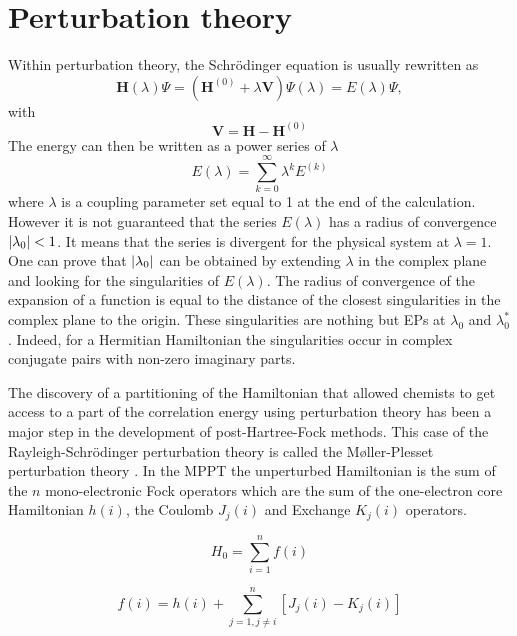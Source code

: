 \documentclass[11pt,a4paper]{article}
\newcommand{\bH}{\mathbf{H}}
\newcommand{\bV}{\mathbf{V}}
\begin{document}
\section{Perturbation theory}


Within perturbation theory, the Schr\"odinger equation is usually rewritten as 
\begin{equation}
	\bH(\lambda) \Psi = (\bH^{(0)} + \lambda \bV ) \Psi(\lambda) = E(\lambda) \Psi,
\end{equation}
with
\begin{equation}
\bV=\bH - \bH^{(0)}
\end{equation}
The energy can then be written as a power series of $\lambda$
\begin{equation}
	E(\lambda) = \sum_{k=0}^\infty \lambda^k E^{(k)}
\end{equation}
where $\lambda$ is a coupling parameter set equal to 1 at the end of the calculation. However it is not guaranteed that the series $E(\lambda)$ has a radius of convergence $\abs{\lambda_0} < 1$. It means that the series is divergent for the physical system at $\lambda=1$. One can prove that $\abs{\lambda_0}$ can be obtained by extending $\lambda$ in the complex plane and looking for the singularities of $E(\lambda)$. The radius of convergence of the expansion of a function is equal to the distance of the closest singularities in the complex plane to the origin. These singularities are nothing but EPs at $\lambda_0$ and $\lambda_0^*$. Indeed, for a Hermitian Hamiltonian the singularities occur in complex conjugate pairs with non-zero imaginary parts.

 The discovery of a partitioning of the Hamiltonian that allowed chemists to get access to a part of the correlation energy using perturbation theory has been a major step in the development of post-Hartree-Fock methods. This case of the Rayleigh-Schrödinger perturbation theory is called the M{\o}ller-Plesset perturbation theory \cite{Moller_1934}. In the MPPT the unperturbed Hamiltonian is the sum of the $n$ mono-electronic Fock operators which are the sum of the one-electron core Hamiltonian $h(i)$, the Coulomb $J_j(i)$ and Exchange $K_j(i)$ operators.
 
\begin{equation}
H_0= \sum\limits_{i=1}^{n} f(i)
\end{equation}

\begin{equation}
f(i) = h(i) + \sum\limits_{j=1,j \neq i}^{n} \left[J_j(i) - K_j(i)\right]
\end{equation}
\end{document}
